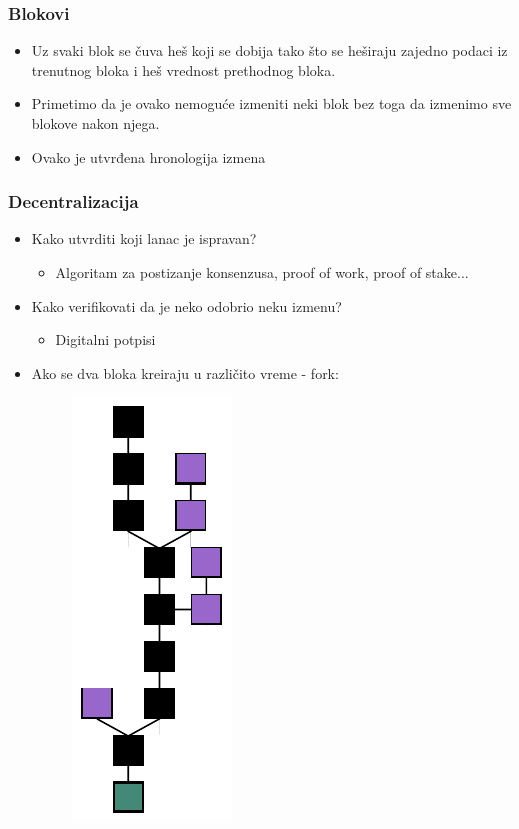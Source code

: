 \documentclass{beamer}
\begin{document}
\begin{frame}[fragile]\frametitle{Blokovi}
	\begin{itemize}
		\item Uz svaki blok se čuva heš koji se dobija tako što se heširaju zajedno podaci iz trenutnog bloka i heš vrednost prethodnog bloka.
		\item Primetimo da je ovako nemoguće izmeniti neki blok bez toga da izmenimo sve blokove nakon njega.
		\item Ovako je utvrđena hronologija izmena
	\end{itemize}
\end{frame}

\begin{frame}[fragile]\frametitle{Decentralizacija}
	\begin{itemize}
		\item Kako utvrditi koji lanac je ispravan?
		\begin{itemize}
			\item Algoritam za postizanje konsenzusa, proof of work, proof of stake...
		\end{itemize}
		\item Kako verifikovati da je neko odobrio neku izmenu?
		\begin{itemize}
			\item Digitalni potpisi
		\end{itemize}
		\item Ako se dva bloka kreiraju u različito vreme - fork:
		\begin{figure}[H]
			\includegraphics[scale=0.7,angle=-90,origin=c]{blockchain_fork.pdf}
		\end{figure}
	\end{itemize}
\end{frame}
\end{document}
